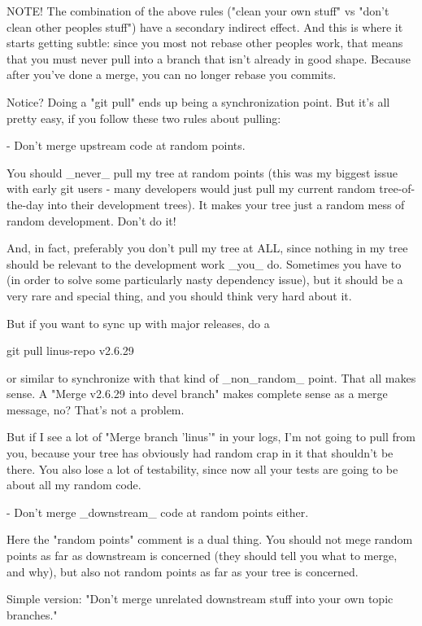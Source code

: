 NOTE! The combination of the above rules ("clean your own stuff" vs "don't 
clean other peoples stuff") have a secondary indirect effect. And this is 
where it starts getting subtle: since you most not rebase other peoples 
work, that means that you must never pull into a branch that isn't already 
in good shape. Because after you've done a merge, you can no longer rebase 
you commits.

Notice? Doing a "git pull" ends up being a synchronization point. But it's 
all pretty easy, if you follow these two rules about pulling:

 - Don't merge upstream code at random points. 

   You should _never_ pull my tree at random points (this was my biggest 
   issue with early git users - many developers would just pull my current 
   random tree-of-the-day into their development trees). It makes your 
   tree just a random mess of random development. Don't do it!

   And, in fact, preferably you don't pull my tree at ALL, since nothing 
   in my tree should be relevant to the development work _you_ do. 
   Sometimes you have to (in order to solve some particularly nasty 
   dependency issue), but it should be a very rare and special thing, and 
   you should think very hard about it.

   But if you want to sync up with major releases, do a

        git pull linus-repo v2.6.29

   or similar to synchronize with that kind of _non_random_ point. That 
   all makes sense. A "Merge v2.6.29 into devel branch" makes complete 
   sense as a merge message, no? That's not a problem.

   But if I see a lot of "Merge branch 'linus'" in your logs, I'm not 
   going to pull from you, because your tree has obviously had random crap 
   in it that shouldn't be there. You also lose a lot of testability, 
   since now all your tests are going to be about all my random code.

 - Don't merge _downstream_ code at random points either.

   Here the "random points" comment is a dual thing. You should not mege 
   random points as far as downstream is concerned (they should tell you 
   what to merge, and why), but also not random points as far as your tree 
   is concerned.

   Simple version: "Don't merge unrelated downstream stuff into your own 
   topic branches."

